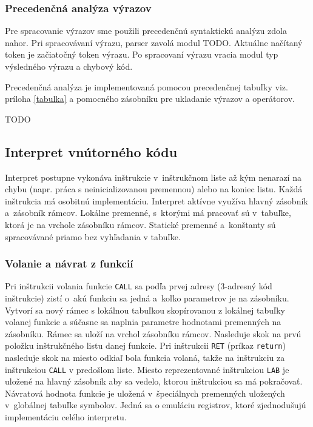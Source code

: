 \documentclass[11pt,a4paper]{article}
\begin{document}
        \subsubsection{Precedenčná analýza výrazov}
        \label{precedencna analyza}
        
        Pre spracovanie výrazov sme použili precedenčnú syntaktickú analýzu zdola nahor. Pri spracovávaní výrazu, parser zavolá modul TODO. Aktuálne načítaný token je začiatočný token výrazu. Po spracovaní výrazu vracia modul typ výsledného výrazu a chybový kód. 
        
        Precedenčná analýza je implementovaná pomocou precedenčnej tabuľky viz. príloha \ref{tabulka} a pomocného zásobníku pre ukladanie výrazov a operátorov.
        
        TODO
        
    \subsection{Interpret vnútorného kódu}
    \label{interpret}
    Interpret postupne vykonáva inštrukcie v~inštrukčnom liste až kým nenarazí na chybu (napr. práca s neinicializovanou premennou)
    alebo na koniec listu. Každá inštrukcia má osobitnú implementáciu. Interpret aktívne využíva hlavný zásobník a~zásobník rámcov.
    Lokálne premenné, s~ktorými má pracovať  sú v~tabuľke, ktorá je na vrchole zásobníku rámcov. Statické premenné a~konštanty sú spracovávané
    priamo bez vyhľadania v tabuľke.

       \subsubsection{Volanie a návrat z funkcií}
       \label{funkcia}
       Pri inštrukcii volania funkcie \texttt{CALL} sa podľa prvej adresy (3-adresný kód inštrukcie) zistí o~akú funkciu sa jedná a~koľko parametrov je na zásobníku.
       Vytvorí sa nový rámec s lokálnou tabuľkou skopírovanou z lokálnej tabuľky volanej funkcie a súčasne sa naplnia parametre
       hodnotami premenných na zásobníku. Rámec sa uloží na vrchol zásobníku rámcov. Nasleduje skok na prvú položku inštrukčného listu danej funkcie.
       Pri inštrukcii \texttt{RET} (príkaz \texttt{return}) nasleduje skok na miesto odkiaľ bola funkcia volaná, takže na inštrukciu za
       inštrukciou \texttt{CALL} v predošlom liste. Miesto reprezentované inštrukciou \texttt{LAB} je uložené na hlavný zásobník aby sa
       vedelo, ktorou inštrukciou sa má pokračovať. Návratová hodnota funkcie je uložená v~špeciálnych premenných uložených v~globálnej
       tabuľke symbolov. Jedná sa o emuláciu registrov, ktoré zjednodušujú implementáciu celého interpretu.
\end{document}
